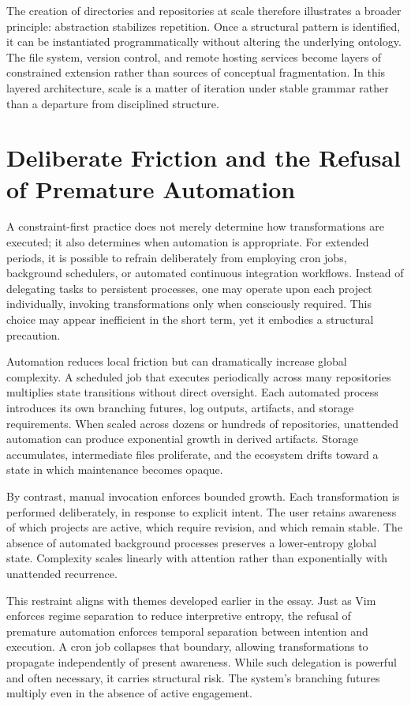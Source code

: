 \documentclass[12pt]{article}
\begin{document}
The creation of directories and repositories at scale therefore illustrates a broader principle: abstraction stabilizes repetition. Once a structural pattern is identified, it can be instantiated programmatically without altering the underlying ontology. The file system, version control, and remote hosting services become layers of constrained extension rather than sources of conceptual fragmentation. In this layered architecture, scale is a matter of iteration under stable grammar rather than a departure from disciplined structure.

\section{Deliberate Friction and the Refusal of Premature Automation}

A constraint-first practice does not merely determine how transformations are executed; it also determines when automation is appropriate. For extended periods, it is possible to refrain deliberately from employing cron jobs, background schedulers, or automated continuous integration workflows. Instead of delegating tasks to persistent processes, one may operate upon each project individually, invoking transformations only when consciously required. This choice may appear inefficient in the short term, yet it embodies a structural precaution.

Automation reduces local friction but can dramatically increase global complexity. A scheduled job that executes periodically across many repositories multiplies state transitions without direct oversight. Each automated process introduces its own branching futures, log outputs, artifacts, and storage requirements. When scaled across dozens or hundreds of repositories, unattended automation can produce exponential growth in derived artifacts. Storage accumulates, intermediate files proliferate, and the ecosystem drifts toward a state in which maintenance becomes opaque.

By contrast, manual invocation enforces bounded growth. Each transformation is performed deliberately, in response to explicit intent. The user retains awareness of which projects are active, which require revision, and which remain stable. The absence of automated background processes preserves a lower-entropy global state. Complexity scales linearly with attention rather than exponentially with unattended recurrence.

This restraint aligns with themes developed earlier in the essay. Just as Vim enforces regime separation to reduce interpretive entropy, the refusal of premature automation enforces temporal separation between intention and execution. A cron job collapses that boundary, allowing transformations to propagate independently of present awareness. While such delegation is powerful and often necessary, it carries structural risk. The system’s branching futures multiply even in the absence of active engagement.
\end{document}
